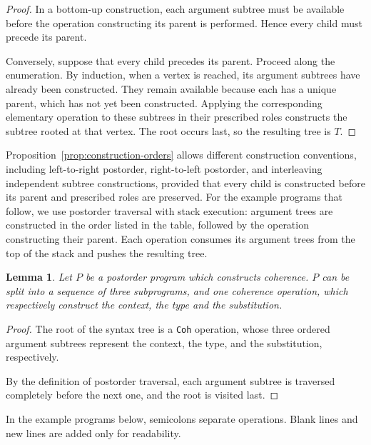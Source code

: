 \documentclass{article}%
\newtheorem{lemma}[theorem]{Lemma}
\theoremstyle{remark}
\theoremstyle{definition}
\theoremstyle{definition}
\theoremstyle{plain}
\begin{document}
\begin{proof}
In a bottom-up construction, each argument subtree must be available before the
operation constructing its parent is performed. Hence every child must precede
its parent.

Conversely, suppose that every child precedes its parent. Proceed along the
enumeration. By induction, when a vertex is reached, its argument subtrees have
already been constructed. They remain available because each has a unique
parent, which has not yet been constructed. Applying the corresponding
elementary operation to these subtrees in their prescribed roles constructs the
subtree rooted at that vertex. The root occurs last, so the resulting tree is
\(T\).
\end{proof}

Proposition~\ref{prop:construction-orders} allows different construction
conventions, including left-to-right postorder, right-to-left postorder, and
interleaving independent subtree constructions, provided that every child is
constructed before its parent and prescribed roles are preserved. For the
example programs that follow, we use postorder traversal with stack execution:
argument trees are constructed in the order listed in the table, followed by the
operation constructing their parent. Each operation consumes its argument trees
from the top of the stack and pushes the resulting tree.

\begin{lemma}
Let \(P\) be a postorder program which constructs \catt coherence. \(P\) can be
split into a sequence of three subprograms, and one coherence operation, which
respectively construct the context, the type and the substitution.
\end{lemma}
\begin{proof}
The root of the syntax tree is a \texttt{Coh} operation, whose three ordered
argument subtrees represent the context, the type, and the substitution,
respectively.

By the definition of postorder traversal, each argument subtree is traversed
completely before the next one, and the root is visited last.
\end{proof}

In the example programs below, semicolons separate operations. Blank lines and
new lines are added only for readability.
\end{document}
